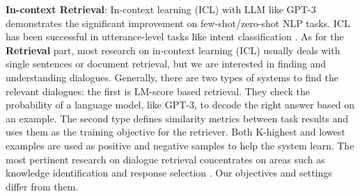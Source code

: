 
\noindent\textbf{In-context Retrieval}: In-context learning (ICL) with LLM like GPT-3 \cite{gpt3} demonstrates the significant improvement on few-shot/zero-shot NLP tasks. ICL has been successful in utterance-level tasks like intent classification \cite{Yu2021FewshotIC}. As for the \textbf{Retrieval} part, most research on in-context learning (ICL) usually deals with single sentences or document retrieval, but we are interested in finding and understanding dialogues. Generally, there are two types of systems to find the relevant dialogues: the first is LM-score based retrieval. They \cite{Rubin2021LearningTR, Shin2021ConstrainedLM} check the probability of a language model, like GPT-3, to decode the right answer based on an example. The second type defines similarity metrics between task results and uses them as the training objective for the retriever. Both K-highest and lowest examples are used as positive and negative samples to help the system learn. The most pertinent research on dialogue retrieval concentrates on areas such as knowledge identification \cite{Wu2021DIALKIKI} and response selection \cite{Yuan2019MultihopSN}. Our objectives and settings differ from them.